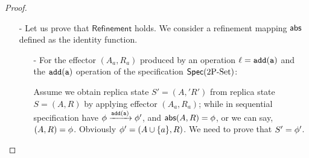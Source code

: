 \begin {proof}
\begin{itemize}
    \begin{itemize}
    \setlength{\itemsep}{0.5pt}
    \item[-] For case when replica $\arep$ do generator of an operation $\alabel = \alabelshort[{\tt write}]{a}$ and then apply its effector: Let $S=(A,R)$ and $S'=(A',R')$ be the replica state of replica $\arep$ of $\aglobalstate$ and $\aglobalstate'$, respectively. Obviously, $(A',R') = (A \cup \{ a \},R)$, and $(A'R')$ is the effector of $\alabel$.

        By Annotation2 of replica state $S$, we can see that Annotation1 of effector $(A',R')$ holds, and Annotation2 of replica state $S'$ holds.

    \item[-] For case when replica $\arep$ apply effector $(A_a,R_a)$ of an operation $\alabel = \alabelshort[{\tt write}]{a}$ originated in a different replica: We only need to prove Annotation2. Let $S=(A,R)$ and $S'=(A',R')$ be the replica state of replica $\arep$ of $\aglobalstate$ and $\aglobalstate'$, respectively.

        By the causal delivery assumption, if $\alabel$ is visible to an operation $\alabel'$, then the effector of $\alabel'$ has not been applied in $\aglobalstate'$ yet; if an operation $\alabel''$ is visible to $\alabel$, then the effector of $\alabel''$ has already been applied in $\aglobalstate'$. By Annotation1 of effector $(A_a,R_a)$, and Annotation2 of replica state $S$, we can see that $A_a \setminus \{ a \} \subseteq A$ and $R_a \subseteq R$, and thus, we can see that $A' = A \cup \{ a \}$ and $R' = R$. Therefore, Annotation2 holds for replica state $S'$.

    \item[-] The cases of $\alabelshort[{\tt remove}]{a}$ can be similarly proved.
    \end{itemize}

\item[-] Let us prove that $\mathsf{Refinement}$ holds. We consider a refinement mapping $\mathsf{abs}$ defined as the identity function.

    \begin{itemize}
    \setlength{\itemsep}{0.5pt}
    \item[-] For the effector $(A_a,R_a)$ produced by an operation $\alabel = \alabelshort[{\tt add}]{a}$ and the $\alabelshort[{\tt add}]{a}$ operation of the specification $\mathsf{Spec}(\text{2P\text{-}Set})$:

    Assume we obtain replica state $S' = (A,'R')$ from replica state $S = (A,R)$ by applying effector $(A_a,R_a)$; while in sequential specification have $\abstate \xrightarrow{\alabelshort[{\tt add}]{a}} \abstate'$, and $\mathsf{abs}(A,R) = \phi$, or we can say, $(A,R) = \phi$. Obviously $\phi' = (A \cup \{ a \},R)$. We need to prove that $S' = \phi'$.


\end{itemize}
\end{itemize}
\end{proof}

